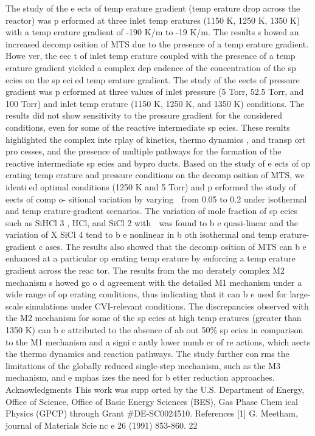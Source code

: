 \documentclass[10pt, letterpaper]{article}
\begin{document}
The study of the e ects of temp erature gradient (temp erature drop across the reactor) was p erformed at
three inlet temp eratures (1150 K, 1250 K, 1350 K) with a temp erature gradient of -190 K/m to -19 K/m.
The results s howed an increased decomp osition of MTS due to the presence of a temp erature gradient.
Howe ver, the eec t of inlet temp erature coupled with the presence of a temp erature gradient yielded a
complex dep endence of the concentration of the sp ecies on the sp ecied temp erature gradient. The study of
the eects of pressure gradient was p erformed at three values of inlet pressure (5 Torr, 52.5 Torr, and 100
Torr) and inlet temp erature (1150 K, 1250 K, and 1350 K) conditions. The results did not show sensitivity
to the pressure gradient for the considered conditions, even for some of the reactive intermediate sp ecies.
These results highlighted the complex inte rplay of kinetics, thermo dynamics , and transp ort pro cesses, and
the presence of multiple pathways for the formation of the reactive intermediate sp ecies and bypro ducts.
Based on the study of e ects of op erating temp erature and pressure conditions on the decomp osition of
MTS, we identied optimal conditions (1250 K and 5 Torr) and p erformed the study of eects of comp o-
sitional variation by varying

from 0.05 to 0.2 under isothermal and temp erature-gradient scenarios. The
variation of mole fraction of sp ecies such as SiHCl
3
, HCl, and SiCl
2
with

was found to b e quasi-linear
and the variation of
X
SiCl
4
tend to b e nonlinear in b oth isothermal and temp erature-gradient c ases. The
results also showed that the decomp osition of MTS can b e enhanced at a particular op erating temp erature
by enforcing a temp erature gradient across the reac tor.
The results from the mo derately complex M2 mechanism s howed go o d agreement with the detailed M1
mechanism under a wide range of op erating conditions, thus indicating that it can b e used for large-scale
simulations under CVI-relevant conditions. The discrepancies observed with the M2 mechanism for some
of the sp ecies at high temp eratures (greater than 1350 K) can b e attributed to the absence of ab out 50\%
sp ecies in comparison to the M1 mechanism and a signic antly lower numb er of re actions, which aects the
thermo dynamics and reaction pathways. The study further conrms the limitations of the globally reduced
single-step mechanism, such as the M3 mechanism, and e mphas izes the need for b etter reduction approaches.
Acknowledgments
This work was supp orted by the U.S. Department of Energy, Office of Science, Office of Basic Energy
Sciences (BES), Gas Phase Chem ical Physics (GPCP) through Grant \#DE-SC0024510.
References
[1]
 G. Meetham, journal of Materials Scie nc e 26 (1991) 853-860.
22
\end{document}
